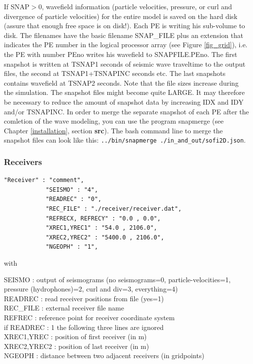 \documentclass[11pt,onecolumn,oneside]{article}
\begin{document}
If SNAP$>0$, wavefield information (particle velocities, pressure, or curl and divergence of particle velocities) for the entire model is saved on the hard disk (assure that enough free space is on disk!). Each PE is writing his sub-volume to disk. The filenames have the basic filename SNAP\_FILE plus an extension that indicates the PE number in the logical processor array (see Figure \ref{fig_grid}), i.e. the PE with number PEno writes his wavefield to SNAPFILE.PEno. The first snapshot is written at TSNAP1 seconds of seismic wave traveltime to the output files, the second at TSNAP1+TSNAPINC seconds etc. The last snapshots contains wavefield at TSNAP2 seconds. Note that the file sizes increase during the simulation. The snapshot files might become quite LARGE. It may therefore be necessary to reduce the amount of snapshot data by increasing IDX and IDY and/or TSNAPINC. In order to merge the separate snapshot of each PE after the comletion of the wave modeling, you can use the program snapmerge (see Chapter \ref{installation}, section \textbf{src}). The bash command line to merge the snapshot files can look like this: \texttt{../bin/snapmerge ./in\_and\_out/sofi2D.json}.


\subsubsection{Receivers}
\begin{verbatim}
"Receiver" : "comment",
			"SEISMO" : "4",
			"READREC" : "0",
			"REC_FILE" : "./receiver/receiver.dat",
			"REFRECX, REFRECY" : "0.0 , 0.0",
			"XREC1,YREC1" : "54.0 , 2106.0",
			"XREC2,YREC2" : "5400.0 , 2106.0",
			"NGEOPH" : "1",
\end{verbatim}

with

SEISMO : output of seismograms (no seismograms=0, particle-velocities=1, pressure (hydrophones)=2, curl and div=3, everything=4)\\
READREC : read receiver positions from file (yes=1)\\
REC\_FILE : external receiver file name\\
REFREC : reference point for receiver coordinate system\\
if READREC : 1 the following three lines are ignored\\
XREC1,YREC : position of first receiver (in m) \\
XREC2,YREC2 : position of last receiver (in m)\\
NGEOPH : distance between two adjacent receivers (in gridpoints)\\
\end{document}
